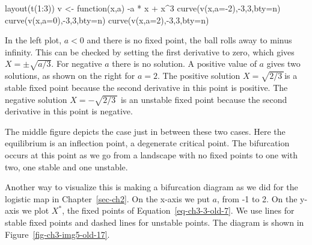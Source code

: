 \documentclass[
  a4paper,
  DIV=11,
  numbers=noendperiod,
  oneside]{scrreprt}
\newenvironment{Shaded}{\begin{snugshade}}{\end{snugshade}}
\newcommand{\AttributeTok}[1]{\textcolor[rgb]{0.40,0.45,0.13}{#1}}
\newcommand{\ControlFlowTok}[1]{\textcolor[rgb]{0.00,0.23,0.31}{#1}}
\newcommand{\DecValTok}[1]{\textcolor[rgb]{0.68,0.00,0.00}{#1}}
\newcommand{\FunctionTok}[1]{\textcolor[rgb]{0.28,0.35,0.67}{#1}}
\newcommand{\NormalTok}[1]{\textcolor[rgb]{0.00,0.23,0.31}{#1}}
\newcommand{\OtherTok}[1]{\textcolor[rgb]{0.00,0.23,0.31}{#1}}
\newcommand{\SpecialCharTok}[1]{\textcolor[rgb]{0.37,0.37,0.37}{#1}}
\newcommand{\StringTok}[1]{\textcolor[rgb]{0.13,0.47,0.30}{#1}}
\begin{document}
\begin{Shaded}
\begin{Highlighting}[]
\FunctionTok{layout}\NormalTok{(}\FunctionTok{t}\NormalTok{(}\DecValTok{1}\SpecialCharTok{:}\DecValTok{3}\NormalTok{))}
\NormalTok{v }\OtherTok{\textless{}{-}} \ControlFlowTok{function}\NormalTok{(x,a) }\SpecialCharTok{{-}}\NormalTok{a }\SpecialCharTok{*}\NormalTok{ x }\SpecialCharTok{+}\NormalTok{ x}\SpecialCharTok{\^{}}\DecValTok{3} 
\FunctionTok{curve}\NormalTok{(}\FunctionTok{v}\NormalTok{(x,}\AttributeTok{a=}\SpecialCharTok{{-}}\DecValTok{2}\NormalTok{),}\SpecialCharTok{{-}}\DecValTok{3}\NormalTok{,}\DecValTok{3}\NormalTok{,}\AttributeTok{bty=}\StringTok{\textquotesingle{}n\textquotesingle{}}\NormalTok{)}
\FunctionTok{curve}\NormalTok{(}\FunctionTok{v}\NormalTok{(x,}\AttributeTok{a=}\DecValTok{0}\NormalTok{),}\SpecialCharTok{{-}}\DecValTok{3}\NormalTok{,}\DecValTok{3}\NormalTok{,}\AttributeTok{bty=}\StringTok{\textquotesingle{}n\textquotesingle{}}\NormalTok{)}
\FunctionTok{curve}\NormalTok{(}\FunctionTok{v}\NormalTok{(x,}\AttributeTok{a=}\DecValTok{2}\NormalTok{),}\SpecialCharTok{{-}}\DecValTok{3}\NormalTok{,}\DecValTok{3}\NormalTok{,}\AttributeTok{bty=}\StringTok{\textquotesingle{}n\textquotesingle{}}\NormalTok{)}
\end{Highlighting}
\end{Shaded}

In the left plot, \(a < 0\) and there is no fixed point, the ball rolls
away to minus infinity. This can be checked by setting the first
derivative to zero, which gives \(X = \pm \sqrt{{a}/{3}}\). For negative
\(a\) there is no solution. A positive value of \(a\) gives two
solutions, as shown on the right for \(a = 2\). The positive solution
\(X = \sqrt{{2}/{3}\ }\)is a stable fixed point because the second
derivative in this point is positive. The negative solution
\(X = - \sqrt{{2}/{3}\ }\) is an unstable fixed point because the second
derivative in this point is negative.

The middle figure depicts the case just in between these two cases. Here
the equilibrium is an inflection point, a degenerate critical point. The
bifurcation occurs at this point as we go from a landscape with no fixed
points to one with two, one stable and one unstable.

Another way to visualize this is making a bifurcation diagram as we did
for the logistic map in Chapter~\ref{sec-ch2}. On the x-axis we put
\(a\), from -1 to 2. On the y-axis we plot \(X^{*}\), the fixed points
of Equation~\ref{eq-ch3-3-old-7}. We use lines for stable fixed points
and dashed lines for unstable points. The diagram is shown in
Figure~\ref{fig-ch3-img5-old-17}.
\end{document}
